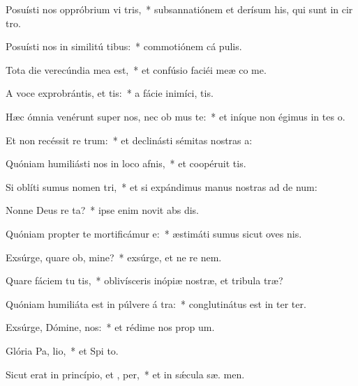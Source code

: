 \item Posuísti nos oppróbrium vi tris,~* subsannatiónem et derísum his, qui sunt in cir tro.
\item Posuísti nos in similitú tibus:~* commotiónem cá  pulis.
\item Tota die verecúndia mea   est,~* et confúsio faciéi meæ co me.
\item A voce exprobrántis, et tis:~* a fácie inimíci,  tis.
\item Hæc ómnia venérunt super nos, nec ob mus te:~* et iníque non égimus in tes o.
\item Et non recéssit re  trum:~* et declinásti sémitas nostras   a:
\item Quóniam humiliásti nos in loco afnis,~* et coopéruit   tis.
\item Si oblíti sumus nomen  tri,~* et si expándimus manus nostras ad de num:
\item Nonne Deus re ta?~* ipse enim novit abs dis.
\item Quóniam propter te mortificámur  e:~* æstimáti sumus sicut oves nis.
\item Exsúrge, quare ob, mine?~* exsúrge, et ne re  nem.
\item Quare fáciem tu tis,~* oblivísceris inópiæ nostræ, et tribula træ?
\item Quóniam humiliáta est in púlvere á tra:~* conglutinátus est in ter  ter.
\item Exsúrge, Dómine,  nos:~* et rédime nos prop  um.
\item Glória Pa,  lio,~* et Spi to.
\item Sicut erat in princípio, et ,  per,~* et in sǽcula sæ. men.
